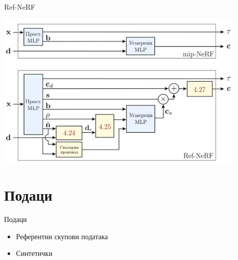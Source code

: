 \documentclass{beamer}
\begin{document}
		\begin{frame}{Ref-NeRF}
			\begin{center}
				\includegraphics[width=0.9\textwidth]{img/img/refnerf-ss.png}
			\end{center}
		\end{frame}

	\section{Подаци}
		\begin{frame}{Подаци}
			\begin{itemize}
				\item Референтни скупови података
				\item Синтетички
			\end{itemize}
		\end{frame}
\end{document}
